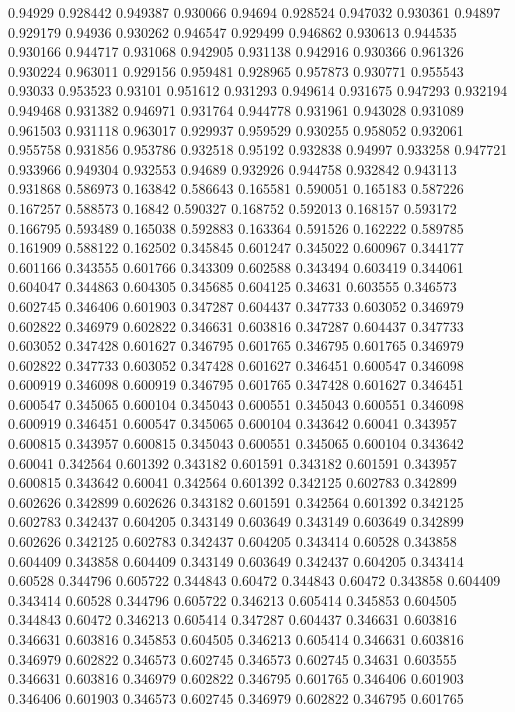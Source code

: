 0.94929 0.928442
0.949387 0.930066
0.94694 0.928524
0.947032 0.930361
0.94897 0.929179
0.94936 0.930262
0.946547 0.929499
0.946862 0.930613
0.944535 0.930166
0.944717 0.931068
0.942905 0.931138
0.942916 0.930366
0.961326 0.930224
0.963011 0.929156
0.959481 0.928965
0.957873 0.930771
0.955543 0.93033
0.953523 0.93101
0.951612 0.931293
0.949614 0.931675
0.947293 0.932194
0.949468 0.931382
0.946971 0.931764
0.944778 0.931961
0.943028 0.931089
0.961503 0.931118
0.963017 0.929937
0.959529 0.930255
0.958052 0.932061
0.955758 0.931856
0.953786 0.932518
0.95192 0.932838
0.94997 0.933258
0.947721 0.933966
0.949304 0.932553
0.94689 0.932926
0.944758 0.932842
0.943113 0.931868
0.586973 0.163842
0.586643 0.165581
0.590051 0.165183
0.587226 0.167257
0.588573 0.16842
0.590327 0.168752
0.592013 0.168157
0.593172 0.166795
0.593489 0.165038
0.592883 0.163364
0.591526 0.162222
0.589785 0.161909
0.588122 0.162502
0.345845 0.601247
0.345022 0.600967
0.344177 0.601166
0.343555 0.601766
0.343309 0.602588
0.343494 0.603419
0.344061 0.604047
0.344863 0.604305
0.345685 0.604125
0.34631 0.603555
0.346573 0.602745
0.346406 0.601903
0.347287 0.604437
0.347733 0.603052
0.346979 0.602822
0.346979 0.602822
0.346631 0.603816
0.347287 0.604437
0.347733 0.603052
0.347428 0.601627
0.346795 0.601765
0.346795 0.601765
0.346979 0.602822
0.347733 0.603052
0.347428 0.601627
0.346451 0.600547
0.346098 0.600919
0.346098 0.600919
0.346795 0.601765
0.347428 0.601627
0.346451 0.600547
0.345065 0.600104
0.345043 0.600551
0.345043 0.600551
0.346098 0.600919
0.346451 0.600547
0.345065 0.600104
0.343642 0.60041
0.343957 0.600815
0.343957 0.600815
0.345043 0.600551
0.345065 0.600104
0.343642 0.60041
0.342564 0.601392
0.343182 0.601591
0.343182 0.601591
0.343957 0.600815
0.343642 0.60041
0.342564 0.601392
0.342125 0.602783
0.342899 0.602626
0.342899 0.602626
0.343182 0.601591
0.342564 0.601392
0.342125 0.602783
0.342437 0.604205
0.343149 0.603649
0.343149 0.603649
0.342899 0.602626
0.342125 0.602783
0.342437 0.604205
0.343414 0.60528
0.343858 0.604409
0.343858 0.604409
0.343149 0.603649
0.342437 0.604205
0.343414 0.60528
0.344796 0.605722
0.344843 0.60472
0.344843 0.60472
0.343858 0.604409
0.343414 0.60528
0.344796 0.605722
0.346213 0.605414
0.345853 0.604505
0.344843 0.60472
0.346213 0.605414
0.347287 0.604437
0.346631 0.603816
0.346631 0.603816
0.345853 0.604505
0.346213 0.605414
0.346631 0.603816
0.346979 0.602822
0.346573 0.602745
0.346573 0.602745
0.34631 0.603555
0.346631 0.603816
0.346979 0.602822
0.346795 0.601765
0.346406 0.601903
0.346406 0.601903
0.346573 0.602745
0.346979 0.602822
0.346795 0.601765
